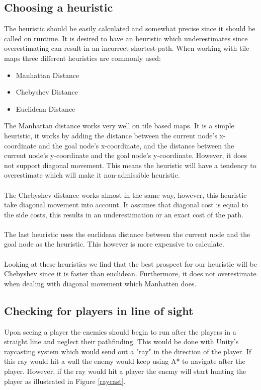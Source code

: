 \subsection*{Choosing a heuristic}
The heuristic should be easily calculated and somewhat precise since it should be called on runtime.
It is desired to have an heuristic which underestimates since overestimating can result in an incorrect shortest-path.
When working with tile maps three different heuristics are commonly used\cite{heuristics}:
\begin{itemize}
\item Manhattan Distance
\item Chebyshev Distance
\item Euclidean Distance
\end{itemize}
The Manhattan distance works very well on tile based maps. 
It is a simple heuristic, it works by adding the distance between the current node's x-coordinate and the goal node's x-coordinate, and the distance between the current node's y-coordinate and the goal node's y-coordinate.
However, it does not support diagonal movement. 
This means the heuristic will have a tendency to overestimate which will make it non-admissible heuristic.\\\\
The Chebyshev distance works almost in the same way, however, this heuristic take diagonal movement into account. 
It assumes that diagonal cost is equal to the side costs, this results in an underestimation or an exact cost of the path.\\\\
The last heuristic uses the euclidean distance between the current node and the goal node as the heuristic.
This however is more expensive to calculate.\\\\
Looking at these heuristics we find that the best prospect for our heuristic will be Chebyshev since it is faster than euclidean. 
Furthermore, it does not overestimate when dealing with diagonal movement which Manhatten does.

\subsection*{Checking for players in line of sight}
Upon seeing a player the enemies should begin to run after the players in a straight line and neglect their pathfinding. 
This would be done with Unity's raycasting system which would send out a "ray" in the direction of the player. 
If this ray would hit a wall the enemy would keep using A* to navigate after the player.
However, if the ray would hit a player the enemy will start hunting the player as illustrated in Figure \ref{raycast}.

